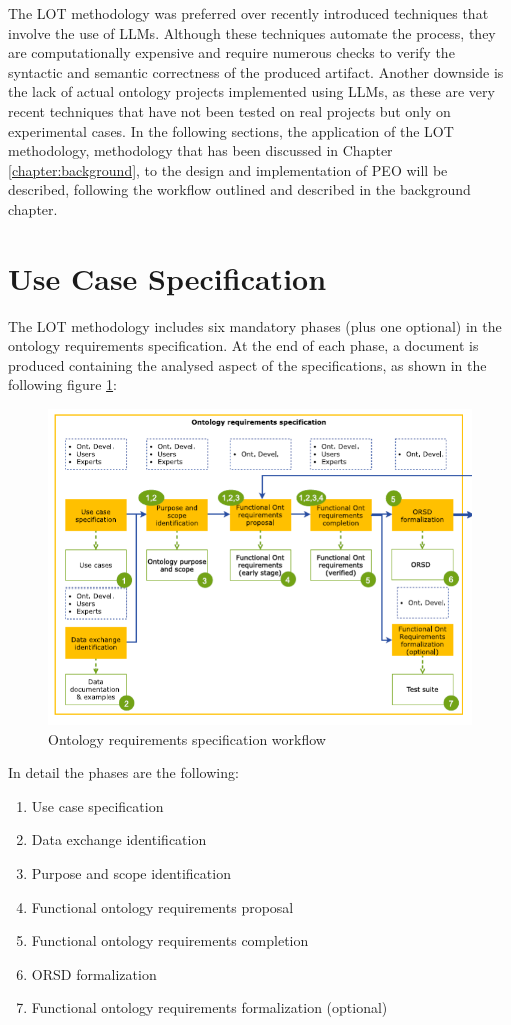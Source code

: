 The LOT methodology was preferred over recently introduced techniques that involve the use of LLMs.
Although these techniques automate the process, they are computationally expensive and require numerous checks to verify the syntactic and semantic correctness of the produced artifact.
Another downside is the lack of actual ontology projects implemented using LLMs, as these are very recent techniques that have not been tested on real projects but only on experimental cases.
In the following sections, the application of the LOT methodology, methodology that has been discussed in Chapter \ref{chapter:background}, to the design and implementation of PEO will be described, following the workflow outlined and described in the background chapter.
\section{Use Case Specification}
The LOT methodology includes six mandatory phases (plus one optional) in the ontology requirements specification.
At the end of each phase, a document is produced containing the analysed aspect of the specifications, as shown in the following figure \ref{fig:13}:
\begin{figure}[H]
    \centering
    \includegraphics[width=0.9\linewidth]{Figures/fig_13.PNG}
    \caption{Ontology requirements specification workflow}
    \label{fig:13}
\end{figure}
In detail the phases are the following:
\begin{enumerate}
    \item Use case specification
    \item Data exchange identification
    \item Purpose and scope identification
    \item Functional ontology requirements proposal
    \item Functional ontology requirements completion
    \item ORSD formalization 
    \item Functional ontology requirements formalization (optional)
\end{enumerate}
